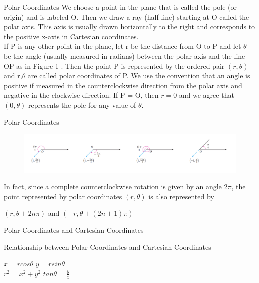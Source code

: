 \documentclass{beamer}
\begin{document}
\begin{frame}{Polar Coordinates}
We choose a point in the plane that is called the pole (or origin) and is
labeled O. Then we draw a ray (half-line) starting at O called the polar
axis. This axis is usually drawn horizontally to the right and corresponds
to the positive x-axis in Cartesian coordinates.\\
If P is any other point in the plane, let r be the distance from O to P and
let $\theta$ be the angle (usually measured in radians) between the polar axis and the line OP as in Figure 1 . Then the point P is represented by the
ordered pair $(r,\theta)$ and r,$\theta$ are called polar coordinates of P. We use the convention that an angle is positive if measured in the counterclockwise direction from the polar axis and negative in the clockwise direction. If P = O, then $r = 0$ and we agree that $(0,\theta)$ represents the pole for any value of $\theta$.
\end{frame}
\begin{frame}{Polar Coordinates}
\begin{figure}[htb]
  \centering
  \includegraphics[width=0.95\linewidth]{polar.png}
\end{figure}
In fact, since a complete counterclockwise rotation is given by an angle
$2\pi$, the point represented by polar coordinates $(r,\theta)$ is also represented by\\
\begin{center}
    $(r,\theta+2n\pi)$ and $(-r,\theta+(2n+1)\pi)$
\end{center}
\end{frame}

\begin{frame}{Polar Coordinates and Cartesian Coordinates}
\begin{block}{Relationship between Polar Coordinates and Cartesian Coordinates}
    \begin{center}
        $x=r cos\theta$  $y=r sin \theta$\\
        $r^2=x^2+y^2$  $tan\theta = \frac{y}{x}$
    \end{center}
\end{block}
\end{frame}
\end{document}
